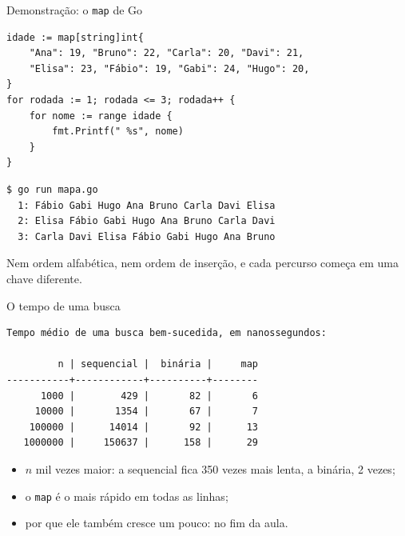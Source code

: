 \documentclass{beamer}
\begin{document}
\begin{frame}[fragile]{Demonstração: o \texttt{map} de Go}
	\begin{verbatim}
idade := map[string]int{
	"Ana": 19, "Bruno": 22, "Carla": 20, "Davi": 21,
	"Elisa": 23, "Fábio": 19, "Gabi": 24, "Hugo": 20,
}
for rodada := 1; rodada <= 3; rodada++ {
	for nome := range idade {
		fmt.Printf(" %s", nome)
	}
}
\end{verbatim}

	\begin{verbatim}
$ go run mapa.go
  1: Fábio Gabi Hugo Ana Bruno Carla Davi Elisa
  2: Elisa Fábio Gabi Hugo Ana Bruno Carla Davi
  3: Carla Davi Elisa Fábio Gabi Hugo Ana Bruno
\end{verbatim}

	\vspace{0.1cm}
	Nem ordem alfabética, nem ordem de inserção, e cada percurso começa em uma
	chave diferente.
\end{frame}

\begin{frame}[fragile]{O tempo de uma busca}
	\begin{verbatim}
Tempo médio de uma busca bem-sucedida, em nanossegundos:

         n | sequencial |  binária |     map
-----------+------------+----------+--------
      1000 |        429 |       82 |       6
     10000 |       1354 |       67 |       7
    100000 |      14014 |       92 |      13
   1000000 |     150637 |      158 |      29
\end{verbatim}

	\vspace{0.2cm}
	\begin{itemize}
		\item $n$ mil vezes maior: a sequencial fica 350 vezes mais lenta, a
		      binária, 2 vezes;
		\item o \texttt{map} é o mais rápido em todas as linhas;
		\item por que ele também cresce um pouco: no fim da aula.
	\end{itemize}
\end{frame}
\end{document}
